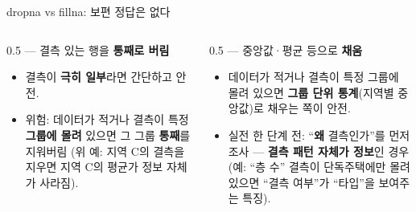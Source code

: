 \begin{frame}{dropna vs fillna: 보편 정답은 없다}
  \begin{columns}[T]
    \begin{column}{0.5\textwidth}
       --- 결측 있는 행을 \textbf{통째로 버림}
      \begin{itemize}
        \item 결측이 \textbf{극히 일부}라면 간단하고 안전.
        \item 위험: 데이터가 적거나 결측이 특정 \textbf{그룹에
          몰려} 있으면 그 그룹 \textbf{통째}를 지워버림
          (위 예: 지역 C의 결측을 지우면 지역 C의 평균가
          정보 자체가 사라짐).
      \end{itemize}
    \end{column}
    \begin{column}{0.5\textwidth}
       --- 중앙값·평균 등으로 \textbf{채움}
      \begin{itemize}
        \item 데이터가 적거나 결측이 특정 그룹에 몰려 있으면
          \textbf{그룹 단위 통계}(지역별 중앙값)로 채우는 쪽이
          안전.
        \item 실전 한 단계 전: ``\textbf{왜} 결측인가''를 먼저
          조사 --- \textbf{결측 패턴 자체가 정보}인 경우 (예:
          ``층 수'' 결측이 단독주택에만 몰려 있으면 ``결측
          여부''가 ``타입''을 보여주는 특징).
      \end{itemize}
    \end{column}
  \end{columns}
\end{frame}
